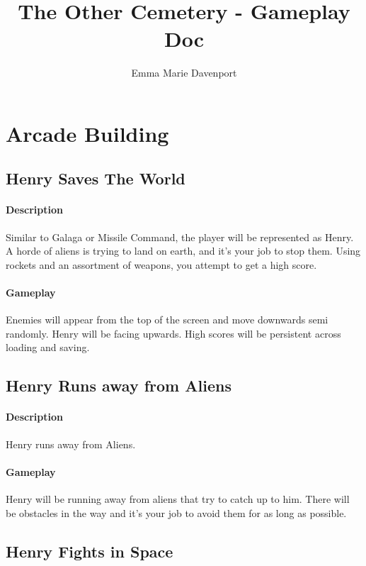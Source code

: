 \documentclass[12pt, a4paper, titlepage]{article}
\author{Emma Marie Davenport}
\title{The Other Cemetery - Gameplay Doc}
\begin{document}
    \maketitle
    
    \section{Arcade Building}
    \subsection{Henry Saves The World}
    
    	\paragraph{Description} Similar to Galaga or Missile Command, the player will be represented as Henry. A horde of aliens is trying to land on earth, and it's your job to stop them. Using rockets and an assortment of weapons, you attempt to get a high score.
    
    	\paragraph{Gameplay} Enemies will appear from the top of the screen and move downwards semi randomly. Henry will be facing upwards. High scores will be persistent across loading
    and saving.
    
    \subsection{Henry Runs away from Aliens}
    
    	\paragraph{Description} Henry runs away from Aliens.
	
	\paragraph{Gameplay}  Henry will be running away from aliens that try to catch up to him. There will be obstacles in the way and it's your job to avoid them for as long as possible.
	
    \subsection{Henry Fights in Space}
    
\end{document}
